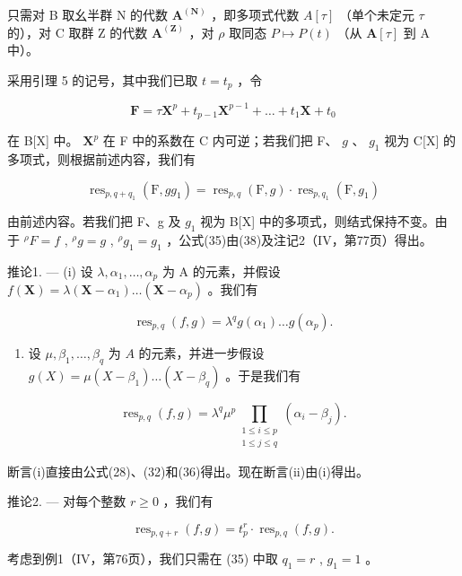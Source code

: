 只需对 B 取幺半群 N 的代数 \(\mathbf{A}^{(\mathbf{N})}\) ，即多项式代数 \(A[\tau]\) （单个未定元 \(\tau\) 的），对 C 取群 Z 的代数 \(\mathbf{A}^{(\mathbf{Z})}\) ，对 \(\rho\) 取同态 \(P \mapsto P(t)\) （从 \(\mathbf{A}[\tau]\) 到 A 中）。

采用引理 5 的记号，其中我们已取 \(t = t_p\) ，令

\[
\mathbf {F} = \tau \mathbf {X} ^ {p} + t _ {p - 1} \mathbf {X} ^ {p - 1} + \dots + t _ {1} \mathbf {X} + t _ {0}\tag{37}
\]

在 B{[}X{]} 中。 \(\mathbf{X}^p\) 在 F 中的系数在 C 内可逆；若我们把 F、 \(g\) 、 \(g_1\) 视为 C{[}X{]} 的多项式，则根据前述内容，我们有

\[
\operatorname{res} _ {p, q + q _ {1}} (\mathrm{F}, g g _ {1}) = \operatorname{res} _ {p, q} (\mathrm{F}, g) \cdot \operatorname{res} _ {p, q _ {1}} (\mathrm{F}, g _ {1})\tag{38}
\]

由前述内容。若我们把 F、g 及 \(g_{1}\) 视为 B{[}X{]} 中的多项式，则结式保持不变。由于 \( {}^{\rho}F = f\) , \( {}^{\rho}g = g\) , \( {}^{\rho}g_{1} = g_{1}\) ，公式(35)由(38)及注记2（IV，第77页）得出。

推论1. --- (i) 设 \(\lambda, \alpha_{1}, \ldots, \alpha_{p}\) 为 A 的元素，并假设 \(f(\mathbf{X}) = \lambda(\mathbf{X} - \alpha_{1}) \ldots (\mathbf{X} - \alpha_{p})\) 。我们有

\[
\operatorname{res} _ {p, q} (f, g) = \lambda^ {q} g (\alpha_ {1}) \dots g (\alpha_ {p}).\tag{39}
\]

\begin{enumerate}
\def\labelenumi{(\roman{enumi})}
\setcounter{enumi}{1}
\tightlist
\item
  设 \(\mu, \beta_1, \ldots, \beta_q\) 为 \(A\) 的元素，并进一步假设 \(g(X) = \mu(X - \beta_1) \ldots (X - \beta_q)\) 。于是我们有
\end{enumerate}

\[
\operatorname{res}_{p,q}(f,g) = \lambda^{q}\mu^{p}\prod_{\substack{1\leqslant i\leqslant p\\ 1\leqslant j\leqslant q}}\left(\alpha_{i} - \beta_{j}\right).\tag{40}
\]

断言(i)直接由公式(28)、(32)和(36)得出。现在断言(ii)由(i)得出。

推论2. --- 对每个整数 \(r \geqslant 0\) ，我们有

\[
\operatorname{res} _ {p, q + r} (f, g) = t _ {p} ^ {r} \cdot \operatorname{res} _ {p, q} (f, g).\tag{41}
\]

考虑到例1（IV，第76页），我们只需在 (35) 中取 \(q_{1} = r\) , \(g_{1} = 1\) 。

